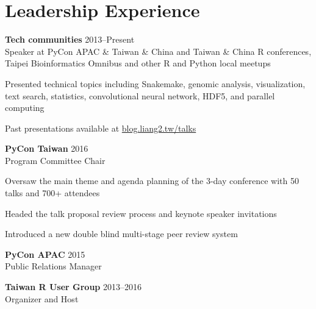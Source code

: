 \section{Leadership Experience}

\begin{entrylist}

\item \textbf{Tech communities} \hfill 2013--Present\\
    Speaker at PyCon APAC \& Taiwan \& China and Taiwan \& China R conferences, Taipei Bioinformatics Omnibus and other R and Python local meetups
    \begin{detaillist}
        \item Presented technical topics including Snakemake, genomic analysis, visualization, text search, statistics, convolutional neural network, HDF5, and parallel computing
        \item Past presentations available at \href{https://blog.liang2.tw/talks/}{blog.liang2.tw/talks}
    \end{detaillist}

\item \textbf{PyCon Taiwan} \hfill 2016\\
    Program Committee Chair
    \begin{detaillist}
        \item Oversaw the main theme and agenda planning of the 3-day conference with 50 talks and 700+ attendees
        \item Headed the talk proposal review process and keynote speaker invitations
        \item Introduced a new double blind multi-stage peer review system
    \end{detaillist}

\item \textbf{PyCon APAC} \hfill 2015\\
    Public Relations Manager

\item \textbf{Taiwan R User Group} \hfill 2013--2016\\
    Organizer and Host
\end{entrylist}
